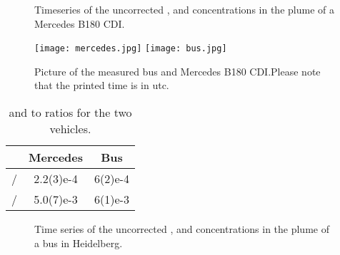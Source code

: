 \begin{figure}[htbp]
  \centering
  
  \caption{Timeseries of the uncorrected ,  and
     concentrations in the plume of a Mercedes B180 CDI.}
  \label{fig:mercedes-ts}
\end{figure}

\begin{figure}[htbp]
  \centering
  \texttt{[image: mercedes.jpg]}
  \hfill  
  \texttt{[image: bus.jpg]}
  \caption{Picture of the measured bus and Mercedes B180 CDI.\@{}Please note that
    the printed time is in utc.}
  \label{fig:bus}
\end{figure}

\begin{table}[hbtp]
  \centering
  \begin{tabular}{l S S}
    \toprule
    & {Mercedes} & {Bus}\\
    \midrule
    / & 2.2(3)e-4 & 6(2)e-4\\
    /& 5.0(7)e-3 & 6(1)e-3\\
    \bottomrule
  \end{tabular}
  \caption{ and  to  ratios for the two
    vehicles.}
  \label{tab:mercedes-bus}
\end{table}

\begin{figure}[htbp]
  \centering
  
  \caption{Time series of the uncorrected ,  and 
    concentrations in the plume of a bus in Heidelberg.}
  \label{fig:bus-ts}
\end{figure}


